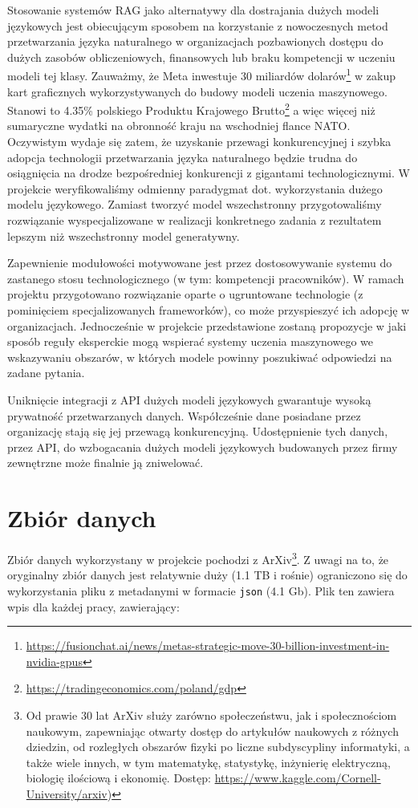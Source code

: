 \documentclass[10pt]{article}
\begin{document}
Stosowanie systemów RAG jako alternatywy dla dostrajania dużych modeli językowych jest obiecującym sposobem na korzystanie z nowoczesnych metod przetwarzania języka naturalnego w organizacjach pozbawionych dostępu do dużych zasobów obliczeniowych, finansowych lub braku kompetencji w uczeniu modeli tej klasy. Zauważmy, że Meta inwestuje 30 miliardów dolarów\footnote{\url{https://fusionchat.ai/news/metas-strategic-move-30-billion-investment-in-nvidia-gpus}} w zakup kart graficznych wykorzystywanych do budowy modeli uczenia maszynowego. Stanowi to 4.35\% polskiego Produktu Krajowego Brutto\footnote{\url{https://tradingeconomics.com/poland/gdp}} a więc więcej niż sumaryczne wydatki na obronność kraju na wschodniej flance NATO. Oczywistym wydaje się zatem, że uzyskanie przewagi konkurencyjnej i szybka adopcja technologii przetwarzania języka naturalnego będzie trudna do osiągnięcia na drodze bezpośredniej konkurencji z gigantami technologicznymi. W projekcie weryfikowaliśmy odmienny paradygmat dot. wykorzystania dużego modelu językowego. Zamiast tworzyć model wszechstronny przygotowaliśmy rozwiązanie wyspecjalizowane w realizacji konkretnego zadania z rezultatem lepszym niż wszechstronny model generatywny.

Zapewnienie modułowości motywowane jest przez dostosowywanie systemu do zastanego stosu technologicznego (w tym: kompetencji pracowników). W ramach projektu przygotowano rozwiązanie oparte o ugruntowane technologie (z pominięciem specjalizowanych frameworków), co może przyspieszyć ich adopcję w organizacjach. Jednocześnie w projekcie przedstawione zostaną propozycje w jaki sposób reguły eksperckie mogą wspierać systemy uczenia maszynowego we wskazywaniu obszarów, w których modele powinny poszukiwać odpowiedzi na zadane pytania.

Uniknięcie integracji z API dużych modeli językowych gwarantuje wysoką prywatność przetwarzanych danych. Współcześnie dane posiadane przez organizację stają się jej przewagą konkurencyjną. Udostępnienie tych danych, przez API, do wzbogacania dużych modeli językowych budowanych przez firmy zewnętrzne może finalnie ją zniwelować.

\section{Zbiór danych}

Zbiór danych wykorzystany w projekcie pochodzi z ArXiv\footnote{Od prawie 30 lat ArXiv służy zarówno społeczeństwu, jak i społecznościom naukowym, zapewniając otwarty dostęp do artykułów naukowych z różnych dziedzin, od rozległych obszarów fizyki po liczne subdyscypliny informatyki, a także wiele innych, w tym matematykę, statystykę, inżynierię elektryczną, biologię ilościową i ekonomię. Dostęp: \url{https://www.kaggle.com/Cornell-University/arxiv})}. Z uwagi na to, że oryginalny zbiór danych jest relatywnie duży (1.1 TB i rośnie) ograniczono się do wykorzystania pliku z metadanymi w formacie \texttt{json} (4.1 Gb). Plik ten zawiera wpis dla każdej pracy, zawierający:
\end{document}
